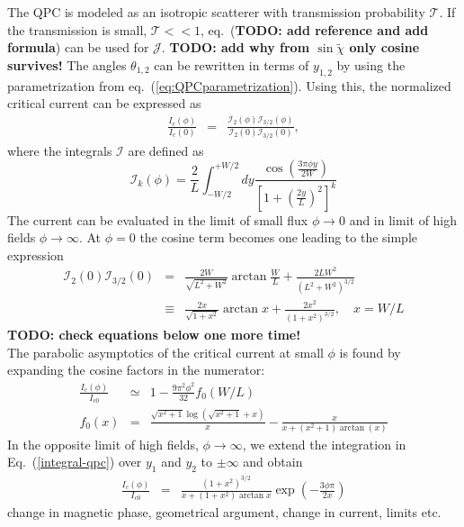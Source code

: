 The QPC is modeled as an isotropic scatterer with transmission probability $\mathcal{T}$. If the transmission is small, $\mathcal{T} << 1$, eq.~(\textbf{TODO: add reference and add formula}) can be used for $\mathcal{J}$.
\textbf{TODO: add why from $\sin \tilde{\chi}$ only cosine survives!}
The angles $\theta_{1, 2}$ can be rewritten in terms of $y_{1, 2}$ by using the parametrization from eq.~(\ref{eq:QPCparametrization}). Using this, the normalized critical current can be expressed as
\begin{eqnarray}
\frac{I_c(\phi)}{I_c(0)} &=& \frac{\mathcal{I}_2(\phi)\mathcal{I}_{3/2}(\phi)}{\mathcal{I}_2(0)\mathcal{I}_{3/2}(0)},
\end{eqnarray}
where the integrals $\mathcal{I}$ are defined as
\begin{equation}
\mathcal{I}_k(\phi) = \frac{2}{L}\int_{-W/2}^{+W/2}dy \frac{\cos\left(\frac{3\pi\phi y}{2W}\right)}{\left[1 + \left(\frac{2y}{L}\right)^2 \right]^k}
\label{integral-qpc}
\end{equation}
The current can be evaluated in the limit of small flux $\phi \rightarrow 0$ and in limit of high fields $\phi \rightarrow \infty$. 
At $\phi=0$ the cosine term becomes one leading to the simple expression
\begin{eqnarray}
\mathcal{I}_2(0)\mathcal{I}_{3/2}(0) &=&
\frac{2 W}{\sqrt{L^2+W^2}}\arctan\frac{W}{L} + \frac{2 L W^2}{(L^2+W^2)^{3/2}} \\
&\equiv& \frac{2x}{\sqrt{1 + x^2}} \arctan x + \frac{2 x^2}{\left( 1 + x^2 \right)^{3/2}}, \quad x = W/L
\label{Ic-0}
\end{eqnarray}
\textbf{TODO: check equations below one more time!} \\
The parabolic asymptotics of the critical current at small $\phi$ is found by expanding the cosine factors in the numerator:
\begin{eqnarray}
\frac{I_c(\phi)}{I_{c0}}&\simeq& 1 - \frac{9\pi ^2 \phi^2 }{32} f_0(W/L) \\
f_0(x) &=& \frac{\sqrt{x^2+1} \log \left(\sqrt{x^2+1}+x\right)}{x}- \frac{x}{x+\left(x^2+1\right) \arctan(x)} 
\end{eqnarray}
In the opposite limit of high fields, $\phi\to \infty$, we extend the integration in Eq.~(\ref{integral-qpc}) over $y_1$ and $y_2$ to $\pm \infty$ and obtain
\begin{eqnarray}
\frac{I_c(\phi)}{I_{c0}} &=& \frac{\left(1+x^2\right)^{3/2}}{x + \left(1+x^2\right)\arctan x}\exp\left(-\frac{3\phi\pi}{2x}\right)
\label{large-phi}
\end{eqnarray}
change in magnetic phase, geometrical argument, change in current, limits etc. 




